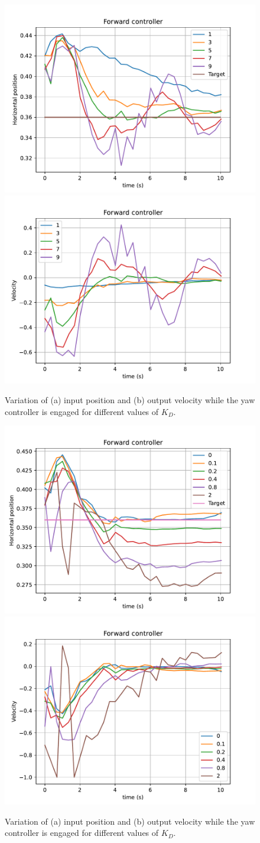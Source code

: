 \begin{figure}
  \centering
  \includegraphics[width=.45\linewidth]{img/4.1-tune/fwd_p2_feedback.pdf}
  \includegraphics[width=.45\linewidth]{img/4.1-tune/fwd_p2_speed.pdf}
  \caption{Variation of (a) input position and (b) output velocity while the yaw controller is engaged for different values of $K_{D}$.}\label{fig:tune-yaw-deriv}
\end{figure}

\begin{figure}
  \centering
  \includegraphics[width=.45\linewidth]{img/4.1-tune/fwd_i1_feedback.pdf}
  \includegraphics[width=.45\linewidth]{img/4.1-tune/fwd_i1_speed.pdf}
  \caption{Variation of (a) input position and (b) output velocity while the yaw controller is engaged for different values of $K_{D}$.}\label{fig:tune-yaw-deriv}
\end{figure}

